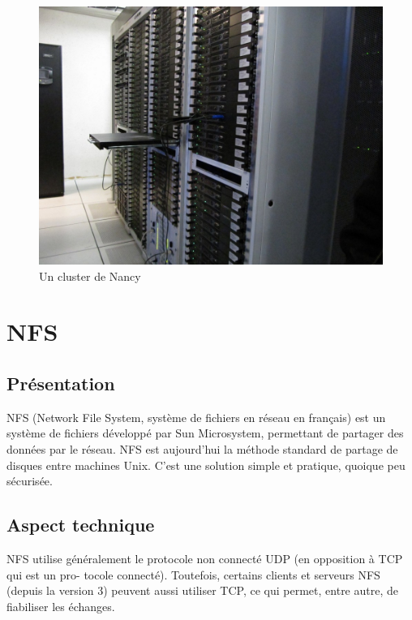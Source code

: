 \documentclass[12pt]{report}
\begin{document}
		\begin{figure}[H]
			\begin{center}
				\includegraphics[width=0.6\linewidth]{images/cluster_nancy.jpg}
				\caption{Un cluster de Nancy}
			\end{center}
		\end{figure}
		


	\chapter{NFS}
		\section{Présentation}

NFS (Network File System, système de fichiers en réseau en français) est un système de fichiers développé par Sun Microsystem, permettant de partager des données par le réseau. NFS est aujourd’hui la méthode standard de partage de disques entre machines Unix. 
		C’est une solution simple et pratique, quoique peu sécurisée.\\
		
		\section{Aspect technique}
		
		NFS utilise généralement le protocole non connecté UDP (en opposition à TCP qui est un pro-
    tocole connecté). Toutefois, certains clients et serveurs NFS (depuis la version 3) peuvent aussi
    utiliser TCP, ce qui permet, entre autre, de fiabiliser les échanges.\\
\end{document}

